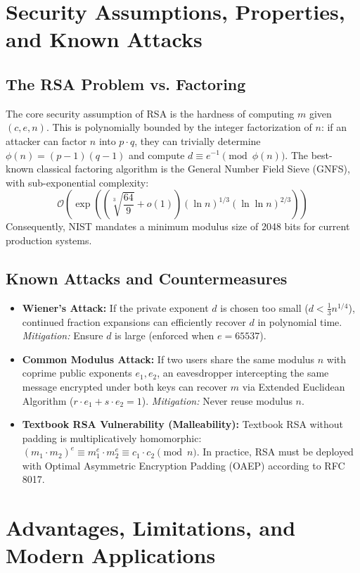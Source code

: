 \section{Security Assumptions, Properties, and Known Attacks}
\subsection{The RSA Problem vs. Factoring}
The core security assumption of RSA is the hardness of computing $m$ given $(c, e, n)$. This is polynomially bounded by the integer factorization of $n$: if an attacker can factor $n$ into $p \cdot q$, they can trivially determine $\phi(n) = (p-1)(q-1)$ and compute $d \equiv e^{-1} \pmod{\phi(n)}$. The best-known classical factoring algorithm is the General Number Field Sieve (GNFS), with sub-exponential complexity:
\begin{equation}
\mathcal{O}\left( \exp\left( \left(\sqrt[3]{\frac{64}{9}} + o(1)\right) (\ln n)^{1/3} (\ln \ln n)^{2/3} \right) \right)
\end{equation}
Consequently, NIST mandates a minimum modulus size of 2048 bits for current production systems.

\subsection{Known Attacks and Countermeasures}
\begin{itemize}
    \item \textbf{Wiener's Attack:} If the private exponent $d$ is chosen too small ($d < \frac{1}{3} n^{1/4}$), continued fraction expansions can efficiently recover $d$ in polynomial time. \emph{Mitigation:} Ensure $d$ is large (enforced when $e = 65537$).
    \item \textbf{Common Modulus Attack:} If two users share the same modulus $n$ with coprime public exponents $e_1, e_2$, an eavesdropper intercepting the same message encrypted under both keys can recover $m$ via Extended Euclidean Algorithm ($r \cdot e_1 + s \cdot e_2 = 1$). \emph{Mitigation:} Never reuse modulus $n$.
    \item \textbf{Textbook RSA Vulnerability (Malleability):} Textbook RSA without padding is multiplicatively homomorphic: $(m_1 \cdot m_2)^e \equiv m_1^e \cdot m_2^e \equiv c_1 \cdot c_2 \pmod n$. In practice, RSA must be deployed with Optimal Asymmetric Encryption Padding (OAEP) according to RFC 8017.
\end{itemize}

\section{Advantages, Limitations, and Modern Applications}

